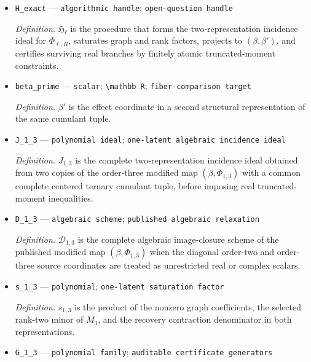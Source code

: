 \documentclass{article}
\begin{document}
\begin{itemize}
  \par\smallskip\noindent\emph{Definition.} \(L_{\ell}=\max\{3,\min\{R\ge2:\binom{R+2}{2}>\ell+3\}\}\); the inner set is nonempty because the binomial coefficient diverges with \(R\).
  \item \texttt{H\_\allowbreak{}exact} --- \texttt{algorithmic handle}; \texttt{open-\allowbreak{}question handle}
  \par\smallskip\noindent\emph{Definition.} \(\mathfrak H_{\ell}\) is the procedure that forms the two-representation incidence ideal for \(\Phi_{\ell,R}\), saturates graph and rank factors, projects to \((\beta,\beta')\), and certifies surviving real branches by finitely atomic truncated-moment constraints.
  \item \texttt{beta\_\allowbreak{}prime} --- \texttt{scalar}; \texttt{\textbackslash{}\allowbreak{}mathbb R}; \texttt{fiber-\allowbreak{}comparison target}
  \par\smallskip\noindent\emph{Definition.} \(\beta'\) is the effect coordinate in a second structural representation of the same cumulant tuple.
  \item \texttt{J\_\allowbreak{}1\_\allowbreak{}3} --- \texttt{polynomial ideal}; \texttt{one-\allowbreak{}latent algebraic incidence ideal}
  \par\smallskip\noindent\emph{Definition.} \(J_{1,3}\) is the complete two-representation incidence ideal obtained from two copies of the order-three modified map \((\beta,\Phi_{1,3})\) with a common complete centered ternary cumulant tuple, before imposing real truncated-moment inequalities.
  \item \texttt{D\_\allowbreak{}1\_\allowbreak{}3} --- \texttt{algebraic scheme}; \texttt{published algebraic relaxation}
  \par\smallskip\noindent\emph{Definition.} \(\mathcal D_{1,3}\) is the complete algebraic image-closure scheme of the published modified map \((\beta,\Phi_{1,3})\) when the diagonal order-two and order-three source coordinates are treated as unrestricted real or complex scalars.
  \item \texttt{s\_\allowbreak{}1\_\allowbreak{}3} --- \texttt{polynomial}; \texttt{one-\allowbreak{}latent saturation factor}
  \par\smallskip\noindent\emph{Definition.} \(s_{1,3}\) is the product of the nonzero graph coefficients, the selected rank-two minor of \(M_3\), and the recovery contraction denominator in both representations.
  \item \texttt{G\_\allowbreak{}1\_\allowbreak{}3} --- \texttt{polynomial family}; \texttt{auditable certificate generators}

\end{itemize}
\end{document}
